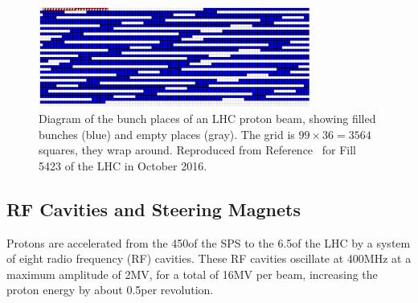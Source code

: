 \begin{figure}[tpb]
  \centering
  \includegraphics[width=0.8\textwidth]{figures/cms/Fill5423BunchPattern.png}
  \caption[Diagram of the bunch places of an LHC proton beam showing filled and empty places.]{Diagram of the bunch places of an LHC proton beam, showing filled bunches (blue) and empty places (gray). The grid is $99 \times 36 = 3564$ squares, \ie they wrap around. Reproduced from Reference~\cite{CMSWBM:Fill5423} for Fill 5423 of the LHC in October 2016.}
  \label{cms:lhcbunchpattern}
\end{figure}

\subsection{RF Cavities and Steering Magnets}
Protons are accelerated from the 450\GeV of the SPS to the 6.5\TeV of the LHC by a system of eight radio frequency (RF) cavities.
These RF cavities oscillate at 400\unit{MHz} at a maximum amplitude of 2\unit{MV}, for a total of 16\unit{MV} per beam, increasing the proton energy by about 0.5\MeV per revolution.

